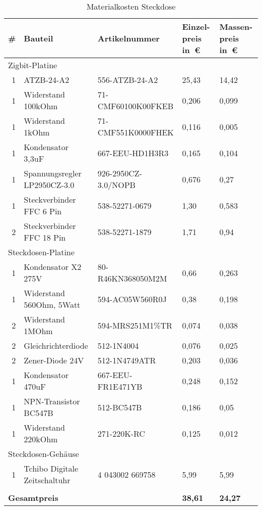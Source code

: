 \begin{table}[htbp]
\small
\caption{Materialkosten Steckdose}
\begin{tabular}{|r|l|l|p{2cm}|p{2cm}|}\hline
  \textbf{\#} & \textbf{Bauteil} & \textbf{Artikelnummer} & \textbf{Einzel-preis in~€} & \textbf{Massen-preis in~€} \\ \hline
  \multicolumn{5}{|l|}{Zigbit-Platine} \\ \hline
  1 & ATZB-24-A2 & 556-ATZB-24-A2 & 25,43 & 14,42 \\ \hline
  1 & Widerstand 100kOhm & 71-CMF60100K00FKEB & 0,206 & 0,099 \\ \hline
  1 & Widerstand 1kOhm & 71-CMF551K0000FHEK  & 0,116 & 0,005 \\ \hline
  1 & Kondensator 3,3uF & 667-EEU-HD1H3R3 & 0,165 & 0,104 \\ \hline
  1 & Spannungsregler LP2950CZ-3.0 & 926-2950CZ-3.0/NOPB & 0,676 & 0,27 \\ \hline
  1 & Steckverbinder FFC 6 Pin & 538-52271-0679 & 1,30 & 0,583 \\ \hline
  2 & Steckverbinder FFC 18 Pin & 538-52271-1879 & 1,71 & 0,94 \\ \hline
  \multicolumn{5}{|l|}{Steckdosen-Platine} \\ \hline
  1 & Kondensator X2 275V & 80-R46KN368050M2M & 0,66 & 0,263 \\ \hline
  1 & Widerstand 560Ohm, 5Watt & 594-AC05W560R0J & 0,38 & 0,198 \\ \hline
  2 & Widerstand 1MOhm & 594-MRS251M1\%TR & 0,074 & 0,038 \\ \hline
  2 & Gleichrichterdiode & 512-1N4004 & 0,076 & 0,025 \\ \hline
  2 & Zener-Diode 24V & 512-1N4749ATR & 0,203 & 0,036 \\ \hline
  1 & Kondensator 470uF & 667-EEU-FR1E471YB & 0,248 & 0,152 \\ \hline
  1 & NPN-Transistor BC547B & 512-BC547B & 0,186 & 0,05 \\ \hline
  1 & Widerstand 220kOhm & 271-220K-RC & 0,125 & 0,012 \\ \hline
  \multicolumn{5}{|l|}{Steckdosen-Gehäuse} \\ \hline
  1 & Tchibo Digitale Zeitschaltuhr & 4 043002 669758 & 5,99 & 5,99 \\ \hline
  \multicolumn{5}{|l|}{} \\ \hline
  \multicolumn{3}{|l|}{\textbf{Gesamtpreis}} & \textbf{38,61} & \textbf{24,27} \\ \hline
\end{tabular}
\label{tab:hardwarekosten}
\end{table}

